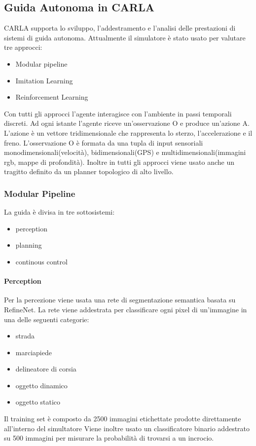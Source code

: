 \subsection{Guida Autonoma in CARLA}
CARLA supporta lo sviluppo, l'addestramento e l'analisi delle prestazioni di sistemi di guida autonoma.
Attualmente il simulatore è stato usato per valutare tre approcci:
\begin{itemize}
    \item Modular pipeline
    \item Imitation Learning
    \item Reinforcement Learning
\end{itemize}
Con tutti gli approcci l'agente interagisce con l'ambiente in passi temporali discreti. Ad ogni istante  l'agente riceve un'osservazione O e produce un'azione 
A. L'azione è un vettore tridimensionale che rappresenta lo sterzo, l'accelerazione e il freno. L'osservazione O è formata da una tupla di input
sensoriali monodimensionali(velocità), bidimensionali(GPS) e multidimensionali(immagini rgb, mappe di profondità). Inoltre in tutti gli approcci viene usato
anche un tragitto definito da un planner topologico di alto livello.

\subsubsection{Modular Pipeline}
La guida è divisa in tre sottosistemi:
\begin{itemize}
    \item perception
    \item planning
    \item continous control
\end{itemize}

\paragraph{Perception} Per la percezione viene usata una rete di segmentazione semantica basata su RefineNet. La rete viene addestrata per classificare ogni
pixel di un'immagine in una delle seguenti categorie:
\begin{itemize}
    \item strada
    \item marciapiede
    \item delineatore di corsia
    \item oggetto dinamico
    \item oggetto statico
\end{itemize}
Il training set è composto da 2500 immagini etichettate prodotte direttamente all'interno del simultatore
Viene inoltre usato un classificatore binario addestrato su 500 immagini per misurare la probabilità di trovarsi a un incrocio.
